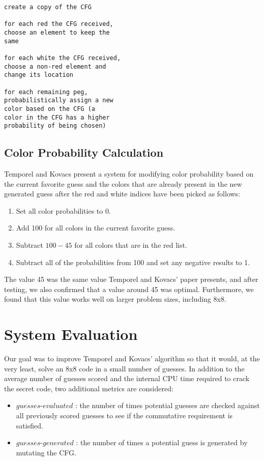 \documentclass[11pt,twocolumn]{article}
\begin{document}
\begin{verbatim}
create a copy of the CFG 

for each red the CFG received,
choose an element to keep the 
same

for each white the CFG received,
choose a non-red element and 
change its location

for each remaining peg, 
probabilistically assign a new
color based on the CFG (a 
color in the CFG has a higher
probability of being chosen)
\end{verbatim}

\subsection{Color Probability Calculation}

Temporel and Kovacs present a system for modifying color probability based on the current favorite guess and the colors that are already present in the new generated guess after the red and white indices have been picked as follows:
\begin{enumerate}
\item Set all color probabilities to 0.
\item Add 100 for all colors in the current favorite guess.
\item Subtract $100-45$ for all colors that are in the red list.
\item Subtract all of the probabilities from 100 and set any negative results to 1.
\end{enumerate}
The value 45 was the same value Temporel and Kovacs' paper presents, and after testing, we also confirmed that a value around 45 was optimal. Furthermore, we found that this value works well on larger problem sizes, including 8x8.


\section{System Evaluation}

Our goal was to improve Temporel and Kovacs' algorithm so that it would, at the very least, solve an 8x8 code in a small number of guesses. In addition to the average number of guesses scored and the internal CPU time required to crack the secret code, two additional metrics are considered:
\begin{itemize}
\item $guesses$-$evaluated$ : the number of times potential guesses are checked against all previously scored guesses to see if the commutative requirement is satisfied.
\item $guesses$-$generated$ : the number of times a potential guess is generated by mutating the CFG. 
\end{itemize}
\end{document}
